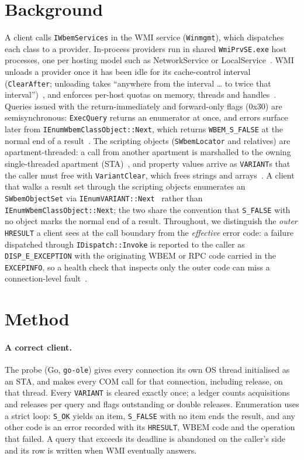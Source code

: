\documentclass[letterpaper,twocolumn,10pt]{article}
\newcommand{\code}[1]{\texttt{\small #1}}
\newcommand{\hr}[1]{\texttt{\small #1}}
\begin{document}
\section{Background}
A client calls \code{IWbemServices} in the WMI service (\code{Winmgmt}), which dispatches each class to a provider.
In-process providers run in shared \code{WmiPrvSE.exe} host processes, one per hosting model such as NetworkService or LocalService~\cite{ms-hosting}.
WMI unloads a provider once it has been idle for its cache-control interval (\code{ClearAfter}; unloading takes ``anywhere from the interval \ldots{} to twice that interval'')~\cite{ms-unload,ms-cachecontrol}, and enforces per-host quotas on memory, threads and handles~\cite{ms-quota}.
Queries issued with the return-immediately and forward-only flags (0x30) are semisynchronous: \code{ExecQuery} returns an enumerator at once, and errors surface later from \code{IEnumWbemClassObject::Next}, which returns \hr{WBEM\_S\_FALSE} at the normal end of a result~\cite{ms-next}.
The scripting objects (\code{SWbemLocator} and relatives) are apartment-threaded: a call from another apartment is marshalled to the owning single-threaded apartment (STA)~\cite{ms-sta}, and property values arrive as \code{VARIANT}s that the caller must free with \code{VariantClear}, which frees strings and arrays~\cite{ms-variantclear}.
A client that walks a result set through the scripting objects enumerates an \code{SWbemObjectSet} via \code{IEnumVARIANT::Next}~\cite{ms-enumvariant} rather than \code{IEnumWbemClassObject::Next}; the two share the convention that \hr{S\_FALSE} with no object marks the normal end of a result.
Throughout, we distinguish the \emph{outer} \code{HRESULT} a client sees at the call boundary from the \emph{effective} error code: a failure dispatched through \code{IDispatch::Invoke} is reported to the caller as \hr{DISP\_E\_EXCEPTION} with the originating WBEM or RPC code carried in the \code{EXCEPINFO}, so a health check that inspects only the outer code can miss a connection-level fault~\cite{ms-wmierr}.

\section{Method}\label{sec:method}
\paragraph{A correct client.}
The probe (Go, \texttt{go-ole}) gives every connection its own OS thread initialised as an STA, and makes every COM call for that connection, including release, on that thread.
Every \code{VARIANT} is cleared exactly once; a ledger counts acquisitions and releases per query and flags outstanding or double releases.
Enumeration uses a strict loop: \hr{S\_OK} yields an item, \hr{S\_FALSE} with no item ends the result, and any other code is an error recorded with its \code{HRESULT}, WBEM code and the operation that failed.
A query that exceeds its deadline is abandoned on the caller's side and its row is written when WMI eventually answers.
\end{document}
